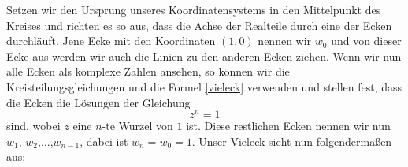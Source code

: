 \documentclass[a4paper,12pt]{article} %
\begin{document}
Setzen wir den Ursprung unseres Koordinatensystems in den Mittelpunkt des Kreises und richten es so aus, dass die Achse der Realteile durch eine der Ecken durchläuft.
Jene Ecke mit den Koordinaten $(1,0)$ nennen wir $w_0$ und von dieser Ecke aus werden wir auch die Linien zu den anderen Ecken ziehen.
Wenn wir nun alle Ecken als komplexe Zahlen ansehen, so können wir die Kreisteilungsgleichungen und die Formel \eqref{vieleck} verwenden und stellen fest, dass die Ecken die Lösungen der Gleichung
\begin{equation}
	z^n=1
\end{equation}
sind, wobei $z$ eine $n$-te Wurzel von $1$ ist.
Diese restlichen Ecken nennen wir nun $w_1$, $w_2$,$\dots$,$w_{n-1}$, dabei ist $w_n = w_0 = 1$.
Unser Vieleck sieht nun folgendermaßen aus:

\begin{center}


\end{center}
\end{document}
